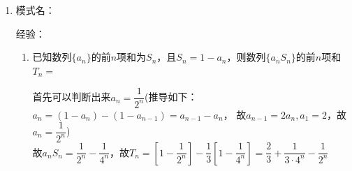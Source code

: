 \begin{enumerate}
    \item 模式名：
    
    经验：

    \begin{enumerate}
        \item 已知数列$\{a_n\}$的前$n$项和为$S_n$，且$S_n = 1 - a_n$，则数列$\{a_n S_n\}$的前$n$项和$T_n = $
        \begin{jieda}
            首先可以判断出来$a_n = \dfrac{1}{2^n}$(推导如下： $a_n = (1-a_n) - (1-a_{n-1}) = a_{n-1} - a_n$， 故$a_{n-1} = 2a_n, a_1 = 2$，故$a_n = \dfrac{1}{2^n}$) \\
            故$a_n S_n = \dfrac{1}{2^n} - \dfrac{1}{4^n}$，故$T_n = \left[1- \dfrac{1}{2^n}\right] - \dfrac{1}{3}\left[1-\dfrac{1}{4^n}\right] = \dfrac{2}{3} + \dfrac{1}{3\cdot4^n} - \dfrac{1}{2^n}$
        \end{jieda}


\end{enumerate}
\end{enumerate}
